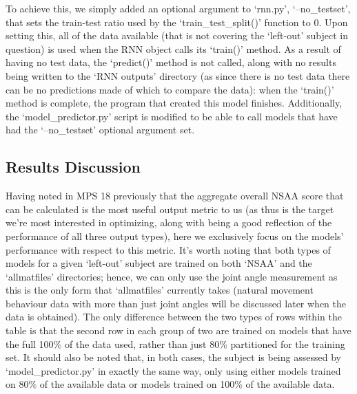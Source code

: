 \documentclass[12pt,twoside]{report}
\begin{document}
\quad To achieve this, we simply added an optional argument to ‘rnn.py’, ‘--no\_testset’, that sets the train-test ratio used by the ‘train\_test\_split()’ function to 0. Upon setting this, all of the data available (that is not covering the ‘left-out’ subject in question) is used when the RNN object calls its ‘train()’ method. As a result of having no test data, the ‘predict()’ method is not called, along with no results being written to the ‘RNN outputs’ directory (as since there is no test data there can be no predictions made of which to compare the data): when the ‘train()’ method is complete, the program that created this model finishes. Additionally, the ‘model\_predictor.py’ script is modified to be able to call models that have had the ‘--no\_testset’ optional argument set.


\subsection{Results Discussion}

\quad Having noted in MPS 18 previously that the aggregate overall NSAA score that can be calculated is the most useful output metric to us (as thus is the target we’re most interested in optimizing, along with being a good reflection of the performance of all three output types), here we exclusively focus on the models’ performance with respect to this metric. It’s worth noting that both types of models for a given ‘left-out’ subject are trained on both ‘NSAA’ and the ‘allmatfiles’ directories; hence, we can only use the joint angle measurement as this is the only form that ‘allmatfiles’ currently takes (natural movement behaviour data with more than just joint angles will be discussed later when the data is obtained). The only difference between the two types of rows within the table is that the second row in each group of two are trained on models that have the full 100\% of the data used, rather than just 80\% partitioned for the training set. It should also be noted that, in both cases, the subject is being assessed by ‘model\_predictor.py’ in exactly the same way, only using either models trained on 80\% of the available data or models trained on 100\% of the available data.\\
\end{document}
